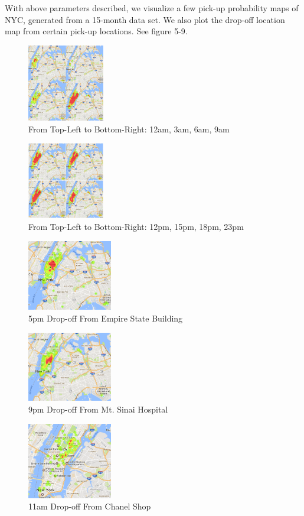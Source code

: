 \documentclass[letterpaper, 10 pt, conference]{ieeeconf}
\begin{document}
With above parameters described, we visualize a few pick-up probability maps of NYC, generated from a 15-month data set. We also plot the drop-off location map from certain pick-up locations. See figure 5-9.
\begin{figure}
\centering
\includegraphics[width=0.3\textwidth]{0-9.jpg}
\caption{From Top-Left to Bottom-Right: 12am, 3am, 6am, 9am}
\end{figure}
\begin{figure}
\centering
\includegraphics[width=0.3\textwidth]{12-23.jpg}
\caption{From Top-Left to Bottom-Right: 12pm, 15pm, 18pm, 23pm}
\end{figure}
\begin{figure}
\centering
\includegraphics[width=0.33\textwidth]{5pm-empire-state.png}
\caption{5pm Drop-off From Empire State Building}
\end{figure}
\begin{figure}
\centering
\includegraphics[width=0.33\textwidth]{9-MtSinaiHospital.png}
\caption{9pm Drop-off From Mt. Sinai Hospital}
\end{figure}
\begin{figure}
\centering
\includegraphics[width=0.33\textwidth]{11-chanel-shop.png}
\caption{11am Drop-off From Chanel Shop}
\end{figure}
\end{document}
